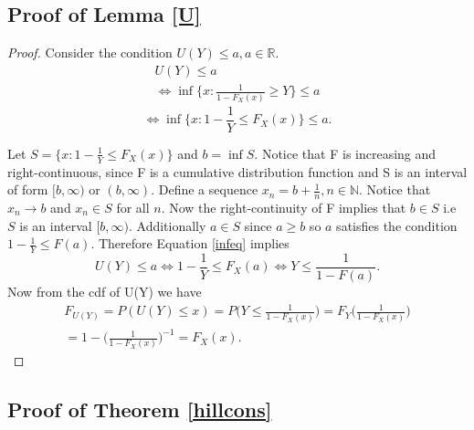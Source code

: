 \documentclass[english,12pt,a4paper,pdftex,sci,utf8]{aaltothesis} %
\begin{document}
\subsection{Proof of Lemma \ref{U}}

\begin{proof}
Consider the condition $U(Y) \leq a, a \in \mathbb{R}$.
\begin{equation*}
\begin{split}
U(Y) \leq a \\
\Leftrightarrow \inf\big\{x: \frac{1}{1-F_X(x)} \geq Y\big\} \leq a
\end{split}
\end{equation*}
\begin{equation}
\Leftrightarrow \inf\big\{x: 1 - \frac{1}{Y} \leq F_X(x)\big\} \leq a.
\label{infeq}
\end{equation}


Let $S=\big\{x: 1 - \frac{1}{Y} \leq F_X(x)\big\}$ and $b = \inf S$. Notice that F is increasing and right-continuous, since F is a cumulative distribution function and S is an interval of form $[b,\infty)$ or $(b, \infty)$. Define a sequence $x_n=b+\frac{1}{n}, n\in \mathbb{N}$. Notice that $x_n \rightarrow b$ and $x_n \in S$ for all $n$. Now the right-continuity of F implies that $b \in S$ i.e $S$ is an interval $[b, \infty)$. Additionally $a \in S$ since $a\geq b$ so $a$ satisfies the condition $1-\frac{1}{Y} \leq F(a)$. Therefore Equation \eqref{infeq} implies
\begin{equation*}
U(Y) \leq a \Leftrightarrow 1 - \frac{1}{Y} \leq F_X(a) \Leftrightarrow Y \leq \frac{1}{1-F(a)}.
\end{equation*}
Now from the cdf of U(Y) we have
\begin{equation*}
\begin{split}
F_{U(Y)} = P(U(Y) \leq x) = P\Big(Y \leq \frac{1}{1-F_X(x)}\Big) = F_Y\Big(\frac{1}{1-F_X(x)}\Big) \\
= 1-\Big(\frac{1}{1-F_X(x)}\Big)^{-1} =F_X(x).
\end{split}
\end{equation*}
\end{proof}

\subsection{Proof of Theorem \ref{hillcons}}
\end{document}
